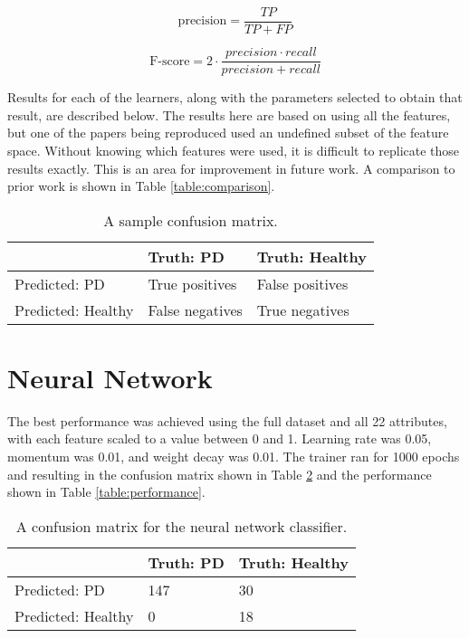 \documentclass[draftcopy]{srpaper}
\begin{document}
\begin{equation}
\mbox{precision} = \frac{TP}{TP + FP}
\label{eq:precision}
\end{equation}

\begin{equation}
\mbox{F-score} = 2 \cdot \frac{precision \cdot recall}{precision + recall}
\label{eq:fscore}
\end{equation}

Results for each of the learners, along with the parameters selected
to obtain that result, are described below. The results here are based
on using all the features, but one of the papers
being reproduced used an undefined subset of the feature
space. Without knowing which features were used, it is difficult to
replicate those results exactly. This is an area for
improvement in future work. A comparison to prior work is shown in
Table \ref{table:comparison}.

\begin{table}
\begin{center}
\begin{tabular}{|l|l|l|} 
\hline
& Truth: PD & Truth: Healthy \\ \hline
Predicted: PD & True positives & False positives \\ \hline
Predicted: Healthy & False negatives & True negatives \\ \hline

\end{tabular}
\end{center}
\caption[Confusion Matrix Sample]{A sample confusion matrix.}
\label{table:sampleCM}
\end{table}

\section{Neural Network}
The best performance was achieved using the full dataset and all 22 attributes, with each
feature scaled to a value between 0 and 1. Learning rate was 0.05,
momentum was 0.01, and weight decay was 0.01. The trainer ran for 1000
epochs and resulting in the confusion matrix shown in Table
\ref{table:NNCM} and the performance shown in Table
\ref{table:performance}.

\begin{table}
\begin{center}
\begin{tabular}{|l|l|l|} 
\hline
& Truth: PD & Truth: Healthy \\ \hline
Predicted: PD & 147 & 30 \\ \hline
Predicted: Healthy & 0 & 18 \\ \hline

\end{tabular}
\end{center}
\caption[Confusion Matrix for Neural Network]{A confusion matrix for
  the neural network classifier.}
\label{table:NNCM}
\end{table}
\end{document}
